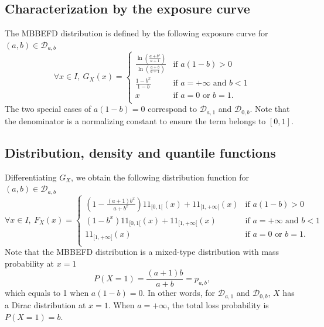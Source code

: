 \documentclass[article, nojss]{jss}
\newcommand{\ind}{1\!\!1}
\newcommand{\calD}{\mathcal D}
\newcommand{\systL}{\left\{\begin{array}{ll}}
\newcommand{\systR}{\end{array}\right.}
\begin{document}
\subsection{Characterization by the exposure curve}
The MBBEFD distribution is defined by the following exposure curve for $(a,b)\in\calD_{a,b}$
\begin{equation}
\forall x\in I,~
G_X(x) = 
\systL
\frac{\ln(\frac{a+b^x}{a+1})}{\ln(\frac{a+b}{a+1})} & \text{if } a(1-b) >0 \\
\frac{1-b^x}{1-b} & \text{if } a=+\infty \text{ and } b<1 \\
x & \text{if } a=0 \text{ or } b=1. \\
\systR
\label{expcurve:mbbefd:ab}
\end{equation}
The two special cases of $a(1-b)=0$ 
correspond to $\calD_{a,1}$ and $\calD_{0,b}$.
Note that the denominator is a normalizing constant to ensure the term belongs to $[0,1]$.



\subsection{Distribution, density and quantile functions}
Differentiating $G_X$, we obtain the following distribution function
 for $(a,b)\in\calD_{a,b}$
\begin{equation}
\forall x\in I,~
F_X(x) = 
\systL
\left(1-\frac{(a+1)b^x}{a+b^x}\right)\ind_{[0,1[}(x) + \ind_{[1,+\infty[}(x) & \text{if } a(1-b) >0 \\
(1-b^x)\ind_{[0,1[}(x) + \ind_{[1,+\infty[}(x) & \text{if } a=+\infty \text{ and } b<1 \\
\ind_{[1,+\infty[}(x) & \text{if } a=0 \text{ or } b=1. \\
\systR
\label{cdf:mbbefd:ab}
\end{equation}
Note that the MBBEFD distribution is a mixed-type distribution with mass probability at $x=1$
\begin{equation}
P(X=1)  = \frac{(a+1)b}{a+b} = p_{a,b},
\label{mass0:mbbefd:ab}
\end{equation}
which equals to 1 when $a(1-b)=0$. In other words, for $\calD_{a,1}$ and $\calD_{0,b}$, $X$ has a Dirac distribution at $x=1$.
When $a=+\infty$, the total loss probability is $P(X=1)=b$.
\end{document}
